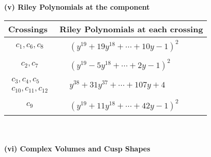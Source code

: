 \documentclass[1p]{elsarticle_modified}
\theoremstyle{definition}
\begin{document}
\newpage\renewcommand{\arraystretch}{1}
\flushleft \textbf{(v) Riley Polynomials at the component}\newline \\
\begin{tabular}{m{50pt}|m{274pt}}
Crossings & \hspace{64pt}Riley Polynomials at each crossing \\
\hline $$\begin{aligned}c_{1},c_{6},c_{8}\end{aligned}$$&$\begin{aligned}
&(y^{19}+19 y^{18}+\cdots+10 y-1)^{2}
\end{aligned}$\\
\hline $$\begin{aligned}c_{2},c_{7}\end{aligned}$$&$\begin{aligned}
&(y^{19}-5 y^{18}+\cdots+2 y-1)^{2}
\end{aligned}$\\
\hline $$\begin{aligned}c_{3},c_{4},c_{5}\\c_{10},c_{11},c_{12}\end{aligned}$$&$\begin{aligned}
&y^{38}+31 y^{37}+\cdots+107 y+4
\end{aligned}$\\
\hline $$\begin{aligned}c_{9}\end{aligned}$$&$\begin{aligned}
&(y^{19}+11 y^{18}+\cdots+42 y-1)^{2}
\end{aligned}$\\
\hline
\end{tabular}\\~\\
\newpage\flushleft \textbf{(vi) Complex Volumes and Cusp Shapes}
\end{document}
